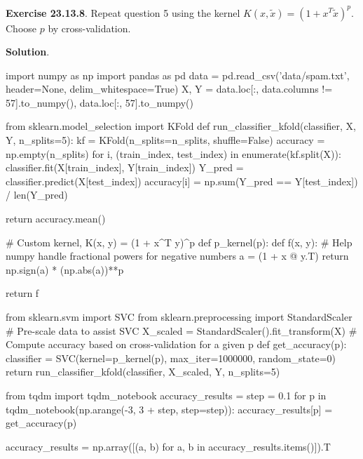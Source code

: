 \textbf{Exercise 23.13.8}. Repeat question 5 using the kernel
\(K(x, \tilde{x}) = (1 + x^T\tilde{x})^p\). Choose \(p\) by
cross-validation.

\textbf{Solution}.

\begin{python}
import numpy as np
import pandas as pd
data = pd.read_csv('data/spam.txt', header=None, delim_whitespace=True)
X, Y = data.loc[:, data.columns != 57].to_numpy(), data.loc[:, 57].to_numpy()
\end{python}

\begin{python}
from sklearn.model_selection import KFold
def run_classifier_{k}fold(classifier, X, Y, n_splits=5):
    kf = KFold(n_splits=n_splits, shuffle=False)
    accuracy = np.empty(n_splits)
    for i, (train_{i}ndex, test_{i}ndex) in enumerate(kf.split(X)):
        classifier.fit(X[train_{i}ndex], Y[train_{i}ndex])
        Y_pred = classifier.predict(X[test_{i}ndex])
        accuracy[i] = np.sum(Y_pred == Y[test_{i}ndex]) / len(Y_pred)
    
    return accuracy.mean()
\end{python}

\begin{python}
# Custom kernel, K(x, y) = (1 + x^T y)^p
def p_{k}ernel(p):
    def f(x, y):
        # Help numpy handle fractional powers for negative numbers
        a = (1 + x @ y.T)
        return np.sign(a) * (np.abs(a))**p
        
    return f
\end{python}

\begin{python}
from sklearn.svm import SVC
from sklearn.preprocessing import StandardScaler
# Pre-scale data to assist SVC
X_scaled = StandardScaler().fit_transform(X)
# Compute accuracy based on cross-validation for a given p
def get_accuracy(p):
    classifier = SVC(kernel=p_{k}ernel(p), max_{i}ter=1000000, random_state=0)
    return run_classifier_{k}fold(classifier, X_scaled, Y, n_splits=5)
\end{python}

\begin{python}
from tqdm import tqdm_notebook
accuracy_results = {}
step = 0.1
for p in tqdm_notebook(np.arange(-3, 3 + step, step=step)):
    accuracy_results[p] = get_accuracy(p)
    
accuracy_results = np.array([(a, b) for a, b in accuracy_results.items()]).T
\end{python}

